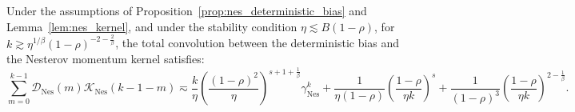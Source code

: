 \begin{lemma}
\label{lem:nes_conv_total}
Under the assumptions of Proposition~\ref{prop:nes_deterministic_bias} and Lemma~\ref{lem:nes_kernel}, and under the stability condition $\eta\lesssim B(1-\rho)$, for $k \gtrsim \eta^{1/\beta}(1-\rho)^{-2-\frac{2}{\beta}}$, the total convolution between the deterministic bias and the Nesterov momentum kernel satisfies:
\begin{equation*}
    \sum_{m=0}^{k-1} \mathcal{D}_{\mathrm{Nes}}(m) \mathcal{K}_{\mathrm{Nes}}(k-1-m) \eqsim \frac{k}{\eta} \left(\frac{(1-\rho)^2}{\eta}\right)^{s+1+\frac{1}{\beta}} \gamma_{\mathrm{Nes}}^k + \frac{1}{\eta(1-\rho)} \left(\frac{1-\rho}{\eta k}\right)^s + \frac{1}{(1-\rho)^3} \left(\frac{1-\rho}{\eta k}\right)^{2-\frac{1}{\beta}}.
\end{equation*}
\end{lemma}
